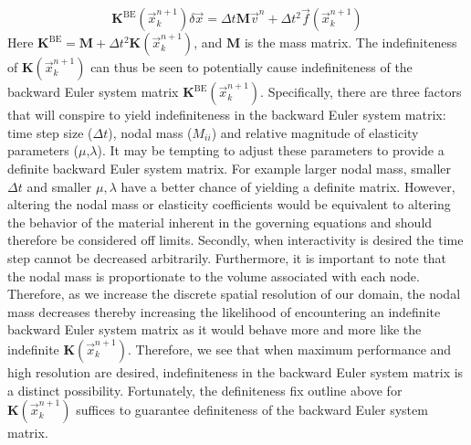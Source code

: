 $$
\mathbf{K}^\textrm{BE}(\vec{x}^{n+1}_{k}) \delta\vec{{x}}=\Delta{t}\mathbf{M} \vec{v}^n+\Delta{t}^2 \vec{f}(\vec{x}^{n+1}_{k})
$$
Here $\mathbf{K}^\textrm{BE} = \mathbf{M}+\Delta{t}^2\mathbf{K}(\vec{x}^{n+1}_{k})$, and $\mathbf{M}$ is the mass matrix. The indefiniteness of $\mathbf{K}(\vec{x}^{n+1}_{k})$ can thus be seen to potentially cause indefiniteness of the backward Euler system matrix $\mathbf{K}^\textrm{BE}(\vec{x}^{n+1}_{k})$. Specifically, there are three factors that will conspire to yield indefiniteness in the  backward Euler system matrix: time step size ($\Delta{t}$), nodal mass ($M_{ii}$) and relative magnitude of elasticity parameters ($\mu$,$\lambda$). It may be tempting to adjust these parameters to provide a definite backward Euler system matrix. For example larger nodal mass, smaller $\Delta{t}$ and smaller $\mu,\lambda$ have a better chance of yielding a definite matrix. However, altering the nodal mass or elasticity coefficients would be equivalent to altering the behavior of the material inherent in the governing equations and should therefore be considered off limits. Secondly, when interactivity is desired the time step cannot be decreased arbitrarily. Furthermore, it is important to note that the nodal mass is proportionate to the volume associated with each node. Therefore, as we increase the discrete spatial resolution of our domain, the nodal mass decreases thereby increasing the likelihood of encountering an indefinite backward Euler system matrix as it would behave more and more like the indefinite $\mathbf{K}(\vec{x}^{n+1}_{k})$. Therefore, we see that when maximum performance and high resolution are desired, indefiniteness in the backward Euler system matrix is a distinct possibility. Fortunately, the definiteness fix outline above for $\mathbf{K}(\vec{x}^{n+1}_{k})$ suffices to guarantee definiteness of the backward Euler system matrix.
